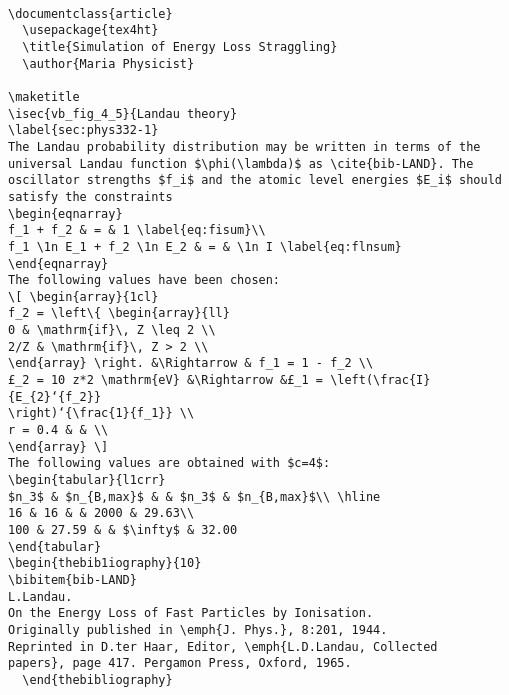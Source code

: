 
\begin{verbatim}

\documentclass{article} 
  \usepackage{tex4ht} 
  \title{Simulation of Energy Loss Straggling} 
  \author{Maria Physicist} 
   
\maketitle 
\isec{vb_fig_4_5}{Landau theory}
\label{sec:phys332-1} 
The Landau probability distribution may be written in terms of the 
universal Landau function $\phi(\lambda)$ as \cite{bib-LAND}. The 
oscillator strengths $f_i$ and the atomic level energies $E_i$ should 
satisfy the constraints 
\begin{eqnarray} 
f_1 + f_2 & = & 1 \label{eq:fisum}\\ 
f_1 \1n E_1 + f_2 \1n E_2 & = & \1n I \label{eq:flnsum} 
\end{eqnarray} 
The following values have been chosen: 
\[ \begin{array}{1cl} 
f_2 = \left\{ \begin{array}{ll} 
0 & \mathrm{if}\, Z \leq 2 \\ 
2/Z & \mathrm{if}\, Z > 2 \\ 
\end{array} \right. &\Rightarrow & f_1 = 1 - f_2 \\ 
£_2 = 10 z*2 \mathrm{eV} &\Rightarrow &£_1 = \left(\frac{I}{E_{2}‘{f_2}} 
\right)‘{\frac{1}{f_1}} \\ 
r = 0.4 & & \\ 
\end{array} \] 
The following values are obtained with $c=4$: 
\begin{tabular}{l1crr} 
$n_3$ & $n_{B,max}$ & & $n_3$ & $n_{B,max}$\\ \hline 
16 & 16 & & 2000 & 29.63\\ 
100 & 27.59 & & $\infty$ & 32.00 
\end{tabular} 
\begin{thebib1iography}{10} 
\bibitem{bib-LAND} 
L.Landau. 
On the Energy Loss of Fast Particles by Ionisation. 
Originally published in \emph{J. Phys.}, 8:201, 1944. 
Reprinted in D.ter Haar, Editor, \emph{L.D.Landau, Collected 
papers}, page 417. Pergamon Press, Oxford, 1965. 
  \end{thebibliography} 
 

\end{verbatim}
